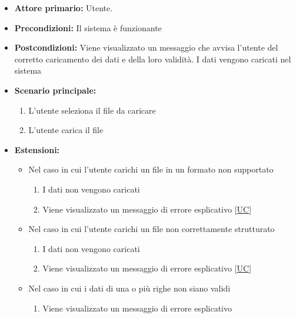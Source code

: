 \begin{itemize}
    \item \textbf{Attore primario:} Utente.
    \item \textbf{Precondizioni:} Il sistema è funzionante
    \item \textbf{Postcondizioni:} Viene visualizzato un messaggio che avvisa l'utente del corretto caricamento dei dati e della loro validità. 
                                   I dati vengono caricati nel sistema
    \item \textbf{Scenario principale:}
          \begin{enumerate}
              \item L'utente seleziona il file da caricare
              \item L'utente carica il file
          \end{enumerate}
    \item \textbf{Estensioni:}
    \begin{itemize}
        \item   Nel caso in cui l'utente carichi un file in un formato non supportato
                \begin{enumerate}
                    \item I dati non vengono caricati
                    \item Viene visualizzato un messaggio di errore esplicativo [\hyperref[sec:UC - Errore formato file]{UC}] %
                \end{enumerate}
        \item   Nel caso in cui l'utente carichi un file non correttamente strutturato
                \begin{enumerate}
                    \item I dati non vengono caricati
                    \item Viene visualizzato un messaggio di errore esplicativo [\hyperref[sec:UC - Errore struttura dataset]{UC}]
                \end{enumerate}
        \item   Nel caso in cui i dati di una o più righe non siano validi
                \begin{enumerate}
                    \item Viene visualizzato un messaggio di errore esplicativo %
                \end{enumerate}
    \end{itemize} 
\end{itemize}
\newpage

